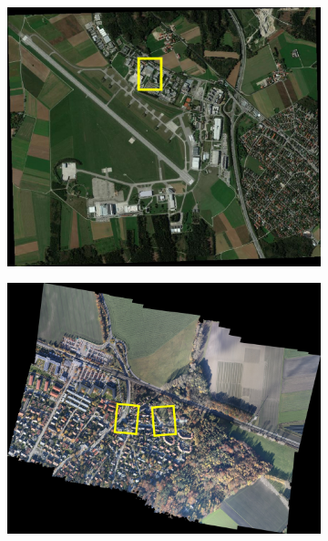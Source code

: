 \begin{figure}[tbp]
    \centering
       \begin{subfigure}[b]{0.3\textwidth}
           \centering
           \includegraphics[width=\textwidth]{figures_dataset/wv2_sat_with_box_rot.png}
       \end{subfigure}
       \hfill
       \begin{subfigure}[b]{0.3\textwidth}  
           \centering 
           \includegraphics[width=\textwidth]{figures_dataset/eichenau_air_with_boxes.png}

\end{subfigure}
\end{figure}
